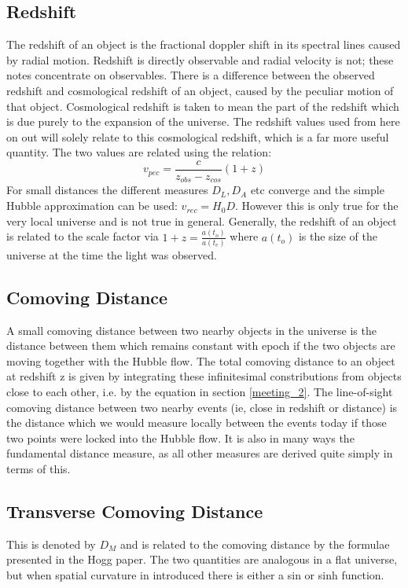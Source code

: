 \documentclass{literature}
\begin{document}
\subsection{Redshift}\label{subs:redshift}
The redshift of an object is the fractional doppler shift in its spectral lines caused by radial motion. Redshift is directly observable and radial velocity is not; these notes concentrate on observables. There is a difference between the observed redshift and cosmological redshift of an object, caused by the peculiar motion of that object. Cosmological redshift is taken to mean the part of the redshift which is due purely to the expansion of the universe. The redshift values used from here on out will solely relate to this cosmological redshift, which is a far more useful quantity. The two values are related using the relation: 
\begin{equation}
v_{pec} = \frac c{z_{obs} - z_{cos}}{(1 + z)}	
\end{equation}
For small distances the different measures $D_{L}, D_{A}$ etc converge and the simple Hubble approximation can be used: $v_{rec} = H_{0}D$. However this is only true for the very local universe and is not true in general. Generally, the redshift of an object is related to the scale factor via $1 + z = \frac{a(t_{o})}{a(t_{e})}$ where $a(t_{o})$ is the size of the universe at the time the light was observed.
\subsection{Comoving Distance}\label{subs:comoving_distance}
A small comoving distance between two nearby objects in the universe is the distance between them which remains constant with epoch if the two objects are moving together with the Hubble flow. The total comoving distance to an object at redshift z is given by integrating these infinitesimal constributions from objects close to each other, i.e. by the equation in section \ref{meeting_2}. The line-of-sight comoving distance between two nearby events (ie, close in redshift or distance) is the distance which we would measure locally between the events today if those two points were locked into the Hubble flow. It is also in many ways the fundamental distance measure, as all other measures are derived quite simply in terms of this. 
\subsection{Transverse Comoving Distance}\label{subs:transverse_comoving_distance}
This is denoted by $D_{M}$ and is related to the comoving distance by the formulae presented in the Hogg paper. The two quantities are analogous in a flat universe, but when spatial curvature in introduced there is either a sin or sinh function. 
\end{document}

